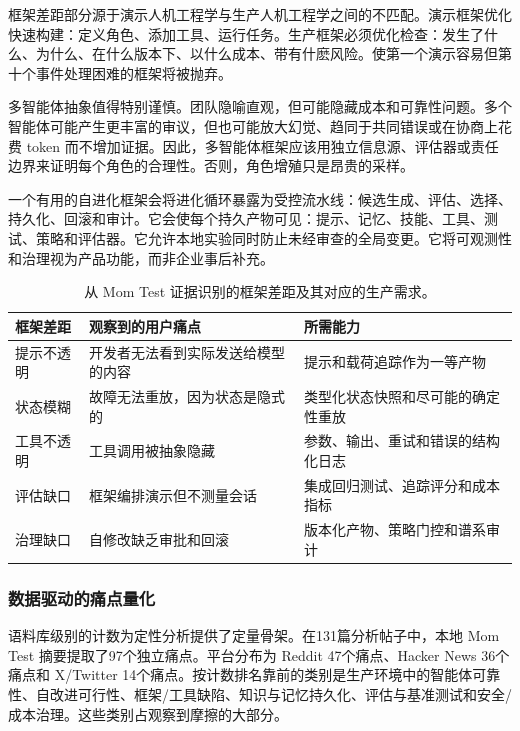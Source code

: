 框架差距部分源于演示人机工程学与生产人机工程学之间的不匹配。演示框架优化快速构建：定义角色、添加工具、运行任务。生产框架必须优化检查：发生了什么、为什么、在什么版本下、以什么成本、带有什麽风险。使第一个演示容易但第十个事件处理困难的框架将被抛弃。

多智能体抽象值得特别谨慎。团队隐喻直观，但可能隐藏成本和可靠性问题。多个智能体可能产生更丰富的审议，但也可能放大幻觉、趋同于共同错误或在协商上花费 token 而不增加证据。因此，多智能体框架应该用独立信息源、评估器或责任边界来证明每个角色的合理性。否则，角色增殖只是昂贵的采样。

一个有用的自进化框架会将进化循环暴露为受控流水线：候选生成、评估、选择、持久化、回滚和审计。它会使每个持久产物可见：提示、记忆、技能、工具、测试、策略和评估器。它允许本地实验同时防止未经审查的全局变更。它将可观测性和治理视为产品功能，而非企业事后补充。

\begin{table}[htbp]
\centering
\small
\begin{tabular}{p{}p{}p{}}
\toprule
\textbf{框架差距} & \textbf{观察到的用户痛点} & \textbf{所需能力} \\
\midrule
提示不透明 & 开发者无法看到实际发送给模型的内容 & 提示和载荷追踪作为一等产物 \\
状态模糊 & 故障无法重放，因为状态是隐式的 & 类型化状态快照和尽可能的确定性重放 \\
工具不透明 & 工具调用被抽象隐藏 & 参数、输出、重试和错误的结构化日志 \\
评估缺口 & 框架编排演示但不测量会话 & 集成回归测试、追踪评分和成本指标 \\
治理缺口 & 自修改缺乏审批和回滚 & 版本化产物、策略门控和谱系审计 \\
\bottomrule
\end{tabular}
\caption{从 Mom Test 证据识别的框架差距及其对应的生产需求。}
\label{tab:ch7-framework-gap-english}
\end{table}

\subsubsection{数据驱动的痛点量化}
\label{sec:ch7-quantification-english}

语料库级别的计数为定性分析提供了定量骨架。在131篇分析帖子中，本地 Mom Test 摘要提取了97个独立痛点。平台分布为 Reddit 47个痛点、Hacker News 36个痛点和 X/Twitter 14个痛点。按计数排名靠前的类别是生产环境中的智能体可靠性、自改进可行性、框架/工具缺陷、知识与记忆持久化、评估与基准测试和安全/成本治理。这些类别占观察到摩擦的大部分。

